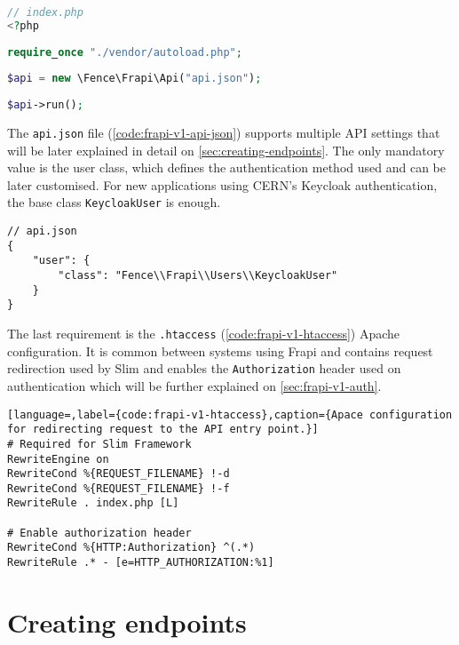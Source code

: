 \begin{lstlisting}[language=PHP,label={code:frapi-v1-index-php},caption={Script executed when any REST API request arrives at the server.}]
// index.php
<?php
 
require_once "./vendor/autoload.php";
  
$api = new \Fence\Frapi\Api("api.json");
 
$api->run();
\end{lstlisting}

The \texttt{api.json} file (\autoref{code:frapi-v1-api-json}) supports multiple API settings that will be later explained in detail on \autoref{sec:creating-endpoints}. The only mandatory value is the user class, which defines the authentication method used and can be later customised. For new applications using CERN's Keycloak \cite{keycloak-website} authentication, the base class \texttt{KeycloakUser} is enough.

\begin{lstlisting}[label={code:frapi-v1-api-json},caption={Minimal configuration for Frapi v1.}]
// api.json
{
    "user": {
        "class": "Fence\\Frapi\\Users\\KeycloakUser"
    }
}
\end{lstlisting}

The last requirement is the \texttt{.htaccess} (\autoref{code:frapi-v1-htaccess}) Apache configuration. It is common between systems using Frapi and contains request redirection used by Slim and enables the \texttt{Authorization} header used on authentication which will be further explained on \autoref{sec:frapi-v1-auth}.

\begin{lstlisting}[language=,label={code:frapi-v1-htaccess},caption={Apace configuration for redirecting request to the API entry point.}]
# Required for Slim Framework
RewriteEngine on
RewriteCond %{REQUEST_FILENAME} !-d
RewriteCond %{REQUEST_FILENAME} !-f
RewriteRule . index.php [L]
 
# Enable authorization header
RewriteCond %{HTTP:Authorization} ^(.*)
RewriteRule .* - [e=HTTP_AUTHORIZATION:%1]
\end{lstlisting}

\section{Creating endpoints}\label{sec:creating-endpoints}

